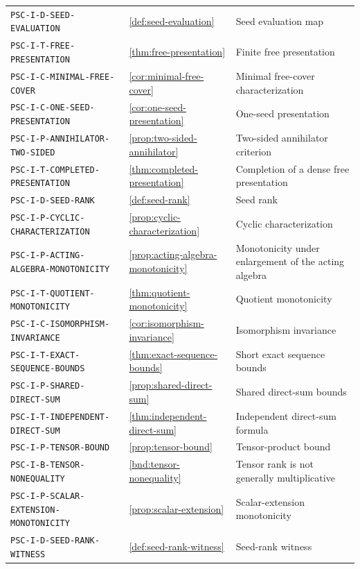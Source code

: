 \documentclass[11pt]{article}
\theoremstyle{definition}
\theoremstyle{remark}
\theoremstyle{definition}\newtheorem{example}[theorem]{Example}
\begin{document}
\begin{longtable}{@{}p{}p{}p{}@{}}
\nolinkurl{PSC-I-D-SEED-EVALUATION} & \ref{def:seed-evaluation} & Seed evaluation map \\
\nolinkurl{PSC-I-T-FREE-PRESENTATION} & \ref{thm:free-presentation} & Finite free presentation \\
\nolinkurl{PSC-I-C-MINIMAL-FREE-COVER} & \ref{cor:minimal-free-cover} & Minimal free-cover characterization \\
\nolinkurl{PSC-I-C-ONE-SEED-PRESENTATION} & \ref{cor:one-seed-presentation} & One-seed presentation \\
\nolinkurl{PSC-I-P-ANNIHILATOR-TWO-SIDED} & \ref{prop:two-sided-annihilator} & Two-sided annihilator criterion \\
\nolinkurl{PSC-I-T-COMPLETED-PRESENTATION} & \ref{thm:completed-presentation} & Completion of a dense free presentation \\
\nolinkurl{PSC-I-D-SEED-RANK} & \ref{def:seed-rank} & Seed rank \\
\nolinkurl{PSC-I-P-CYCLIC-CHARACTERIZATION} & \ref{prop:cyclic-characterization} & Cyclic characterization \\
\nolinkurl{PSC-I-P-ACTING-ALGEBRA-MONOTONICITY} & \ref{prop:acting-algebra-monotonicity} & Monotonicity under enlargement of the acting algebra \\
\nolinkurl{PSC-I-T-QUOTIENT-MONOTONICITY} & \ref{thm:quotient-monotonicity} & Quotient monotonicity \\
\nolinkurl{PSC-I-C-ISOMORPHISM-INVARIANCE} & \ref{cor:isomorphism-invariance} & Isomorphism invariance \\
\nolinkurl{PSC-I-T-EXACT-SEQUENCE-BOUNDS} & \ref{thm:exact-sequence-bounds} & Short exact sequence bounds \\
\nolinkurl{PSC-I-P-SHARED-DIRECT-SUM} & \ref{prop:shared-direct-sum} & Shared direct-sum bounds \\
\nolinkurl{PSC-I-T-INDEPENDENT-DIRECT-SUM} & \ref{thm:independent-direct-sum} & Independent direct-sum formula \\
\nolinkurl{PSC-I-P-TENSOR-BOUND} & \ref{prop:tensor-bound} & Tensor-product bound \\
\nolinkurl{PSC-I-B-TENSOR-NONEQUALITY} & \ref{bnd:tensor-nonequality} & Tensor rank is not generally multiplicative \\
\nolinkurl{PSC-I-P-SCALAR-EXTENSION-MONOTONICITY} & \ref{prop:scalar-extension} & Scalar-extension monotonicity \\
\nolinkurl{PSC-I-D-SEED-RANK-WITNESS} & \ref{def:seed-rank-witness} & Seed-rank witness \\

\end{longtable}
\end{document}
